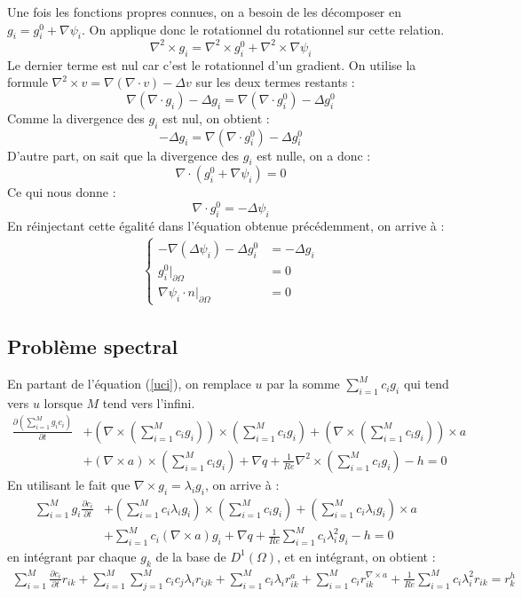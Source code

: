 Une fois les fonctions propres connues, on a besoin de les décomposer en $g_i=g_i^0+\nabla\psi_i$. On applique donc le rotationnel du rotationnel sur cette relation.\\
\[
\nabla^2\times g_i = \nabla^2\times g_i^0 +\nabla^2\times\nabla\psi_i
\]
Le dernier terme est nul car c'est le rotationnel d'un gradient. On utilise la formule $\nabla^2\times v=\nabla(\nabla\cdot v)-\Delta v$ sur les deux termes restants :
\[
\nabla(\nabla\cdot g_i)-\Delta g_i = \nabla(\nabla\cdot g_i^0)-\Delta g_i^0
\]
Comme la divergence des $g_i$ est nul, on obtient :
\[
-\Delta g_i = \nabla(\nabla\cdot g_i^0)-\Delta g_i^0
\]
D'autre part, on sait que la divergence des $g_i$ est nulle, on a donc :
\[
\nabla\cdot (g_i^0+\nabla\psi_i)=0
\]
Ce qui nous donne :
\[
\nabla\cdot g_i^0=-\Delta\psi_i
\]
En réinjectant cette égalité dans l'équation obtenue précédemment, on arrive à :
\begin{eqnarray*}
\left\{
\begin{aligned}
-\nabla(\Delta\psi_i)-\Delta g_i^0 &= -\Delta g_i\\
g_i^0\big\rvert_{\partial\Omega} &= 0\\
\nabla\psi_i\cdot n\big\rvert_{\partial\Omega} &= 0
\end{aligned}
\right.
\end{eqnarray*}

\subsection{Problème spectral}
\label{spectre}

En partant de l'équation (\ref{uci}), on remplace $u$ par la somme $\sum_{i=1}^Mc_ig_i$ qui tend vers $u$ lorsque $M$ tend vers l'infini.
\begin{align*}
\frac{\partial (\sum_{i=1}^Mg_ic_i)}{\partial t} &+ \left(\nabla\times\left(\sum_{i=1}^Mc_ig_i\right)\right)\times\left(\sum_{i=1}^Mc_ig_i\right)  + \left(\nabla\times\left(\sum_{i=1}^Mc_ig_i\right)\right)\times a &\\
&+ \left(\nabla\times a\right)\times\left(\sum_{i=1}^Mc_ig_i\right) + \nabla q  + \frac{1}{Re}\nabla^2\times\left(\sum_{i=1}^Mc_ig_i\right) - h = 0
\end{align*}
En utilisant le fait que $\nabla\times g_i=\lambda_i g_i$, on arrive à :
\begin{align*}
\sum_{i=1}^Mg_i\frac{\partial c_i}{\partial t} &+ \left(\sum_{i=1}^M c_i\lambda_i g_i\right)\times\left(\sum_{i=1}^Mc_ig_i\right) + \left(\sum_{i=1}^Mc_i\lambda_ig_i\right)\times a &\\
&+ \sum_{i=1}^Mc_i\left(\nabla\times a\right)g_i +\nabla q + \frac{1}{Re}\sum_{i=1}^Mc_i\lambda_i^2g_i - h = 0
\end{align*}
en intégrant par chaque $g_k$ de la base de $D^1(\Omega)$, et en intégrant, on obtient :
\begin{align*}
\sum_{i=1}^M\frac{\partial c_i}{\partial t}r_{ik} +\sum_{i=1}^M\sum_{j=1}^Mc_ic_j\lambda_ir_{ijk} +\sum_{i=1}^Mc_i\lambda_ir_{ik}^a +\sum_{i=1}^Mc_ir_{ik}^{\nabla\times a} + \frac{1}{Re}\sum_{i=1}^Mc_i\lambda_i^2r_{ik} = r_k^h
\end{align*}

